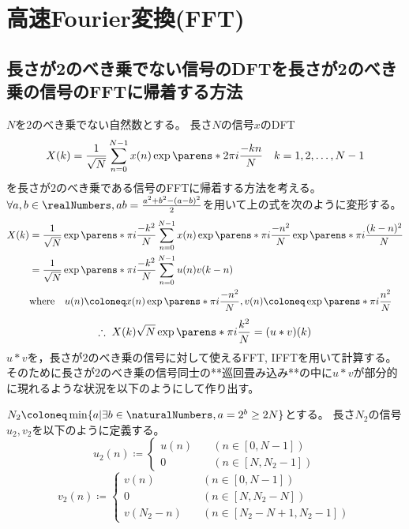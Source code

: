 \chapter{高速Fourier変換(FFT)}
    \section{長さが2のべき乗でない信号のDFTを長さが2のべき乗の信号のFFTに帰着する方法}
        $N$を$2$のべき乗でない自然数とする。
        長さ$N$の信号$x$のDFT
        \[ X(k) = \frac{1}{\sqrt{N}} \sum_{n=0}^{N-1} x(n)\exp \parens*{2\pi i\frac{-kn}{N}} \quad k=1,2,\dots,N-1 \]
        を長さが$2$のべき乗である信号のFFTに帰着する方法を考える。
        $\forall a,b\in\realNumbers,ab = \frac{a^2 + b^2 - (a-b)^2}{2}$を用いて上の式を次のように変形する。
        \begin{align*}
            \begin{aligned}
                X(k) &= \frac{1}{\sqrt{N}} \exp \parens*{\pi i\frac{-k^2}{N}} \sum_{n=0}^{N-1} x(n)\exp \parens*{\pi i\frac{-n^2}{N}} \exp \parens*{\pi i\frac{(k-n)^2}{N}} \\
                &= \frac{1}{\sqrt{N}} \exp \parens*{\pi i\frac{-k^2}{N}} \sum_{n=0}^{N-1} u(n)v(k-n) \\
                & \text{where} \quad u(n) \coloneq x(n)\exp \parens*{\pi i\frac{-n^2}{N}},v(n) \coloneq \exp \parens*{\pi i\frac{n^2}{N}}
            \end{aligned}
        \end{align*}
        \[ \therefore\; X(k)\sqrt{N} \exp \parens*{\pi i\frac{k^2}{N}} = (u*v)(k) \]
        $u*v$を，長さが$2$のべき乗の信号に対して使えるFFT, IFFTを用いて計算する。
        そのために長さが$2$のべき乗の信号同士の**巡回畳み込み**の中に$u*v$が部分的に現れるような状況を以下のようにして作り出す。
        \par
        $N_2 \coloneq \min\{a|\exists b\in \naturalNumbers, a = 2^b \geq 2N\}$とする。
        長さ$N_2$の信号$u_2,v_2$を以下のように定義する。
        \[
            u_2(n) \coloneq \left\{
                \begin{aligned}
                    u(n) &\quad (n \in [0,N-1]) \\
                    0 &\quad (n \in [N,N_2-1])
                \end{aligned}
            \right.
        \]
        \[
            v_2(n) \coloneq \left\{
                \begin{aligned}
                    v(n) &\quad (n \in [0,N-1]) \\
                    0 &\quad (n\in [N,N_2-N]) \\
                    v(N_2-n) &\quad (n \in [N_2-N+1,N_2-1])
                \end{aligned}
            \right.
        \]
